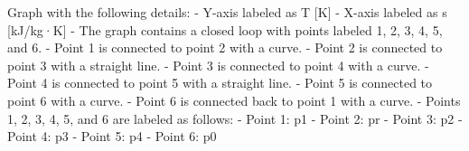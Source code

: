 Graph with the following details:
- Y-axis labeled as T [K]
- X-axis labeled as s [kJ/kg·K]
- The graph contains a closed loop with points labeled 1, 2, 3, 4, 5, and 6.
- Point 1 is connected to point 2 with a curve.
- Point 2 is connected to point 3 with a straight line.
- Point 3 is connected to point 4 with a curve.
- Point 4 is connected to point 5 with a straight line.
- Point 5 is connected to point 6 with a curve.
- Point 6 is connected back to point 1 with a curve.
- Points 1, 2, 3, 4, 5, and 6 are labeled as follows:
  - Point 1: p1
  - Point 2: pr
  - Point 3: p2
  - Point 4: p3
  - Point 5: p4
  - Point 6: p0